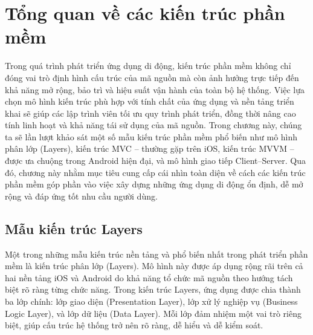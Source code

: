 \section{Tổng quan về các kiến trúc phần mềm}

\begin{flushleft}
  \hspace*{0.8cm}Trong quá trình phát triển ứng dụng di động, kiến trúc phần mềm không chỉ đóng vai trò định hình cấu trúc của mã nguồn mà còn ảnh hưởng trực tiếp đến khả năng mở rộng, bảo trì và hiệu suất vận hành của toàn bộ hệ thống. Việc lựa chọn mô hình kiến trúc phù hợp với tính chất của ứng dụng và nền tảng triển khai sẽ giúp các lập trình viên tối ưu quy trình phát triển, đồng thời nâng cao tính linh hoạt và khả năng tái sử dụng của mã nguồn. Trong chương này, chúng ta sẽ lần lượt khảo sát một số mẫu kiến trúc phần mềm phổ biến như mô hình phân lớp (Layers), kiến trúc MVC – thường gặp trên iOS, kiến trúc MVVM – được ưa chuộng trong Android hiện đại, và mô hình giao tiếp Client–Server. Qua đó, chương này nhằm mục tiêu cung cấp cái nhìn toàn diện về cách các kiến trúc phần mềm góp phần vào việc xây dựng những ứng dụng di động ổn định, dễ mở rộng và đáp ứng tốt nhu cầu người dùng.
\end{flushleft}

\subsection{Mẫu kiến trúc Layers}
\renewcommand{\labelitemi}{--}    
\begin{flushleft}
    \hspace*{0.8cm}Một trong những mẫu kiến trúc nền tảng và phổ biến nhất trong phát triển phần mềm là kiến trúc phân lớp (Layers). Mô hình này được áp dụng rộng rãi trên cả hai nền tảng iOS và Android do khả năng tổ chức mã nguồn theo hướng tách biệt rõ ràng từng chức năng. Trong kiến trúc Layers, ứng dụng được chia thành ba lớp chính: lớp giao diện (Presentation Layer), lớp xử lý nghiệp vụ (Business Logic Layer), và lớp dữ liệu (Data Layer). Mỗi lớp đảm nhiệm một vai trò riêng biệt, giúp cấu trúc hệ thống trở nên rõ ràng, dễ hiểu và dễ kiểm soát.
\end{flushleft}

